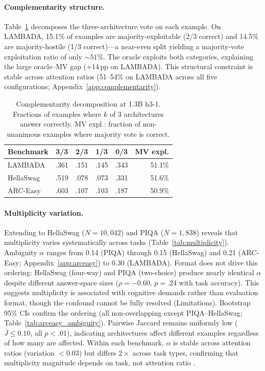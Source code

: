 \paragraph{Complementarity structure.} Table~\ref{tab:complementarity} decomposes the three-architecture vote on each example. On LAMBADA, 15.1\% of examples are majority-exploitable (2/3 correct) and 14.5\% are majority-hostile (1/3 correct)---a near-even split yielding a majority-vote exploitation ratio of only ${\sim}51$\%. The oracle exploits both categories, explaining the large oracle--MV gap ($+14$\,pp on LAMBADA). This structural constraint is stable across attention ratios (51--54\% on LAMBADA across all five configurations; Appendix~\ref{app:complementarity}).

\begin{table}[t]
\centering
\small
\caption{Complementarity decomposition at 1.3B h3-1. Fractions of examples where $k$ of 3 architectures answer correctly. MV expl.: fraction of non-unanimous examples where majority vote is correct.}
\label{tab:complementarity}
\begin{tabular}{@{}lccccr@{}}
\toprule
Benchmark & 3/3 & 2/3 & 1/3 & 0/3 & MV expl. \\
\midrule
LAMBADA & .361 & .151 & .145 & .343 & 51.1\% \\
HellaSwag & .519 & .078 & .073 & .331 & 51.6\% \\
ARC-Easy & .603 & .107 & .103 & .187 & 50.9\% \\
\bottomrule
\end{tabular}
\end{table}

\paragraph{Multiplicity variation.} Extending to HellaSwag ($N = 10{,}042$) and PIQA ($N = 1{,}838$) reveals that multiplicity varies systematically across tasks (Table~\ref{tab:multiplicity}). Ambiguity $\alpha$ \citep{marx2020predictive} ranges from 0.14 (PIQA) through 0.15 (HellaSwag) and 0.21 (ARC-Easy; Appendix~\ref{app:arceasy}) to 0.30 (LAMBADA). Format does not drive this ordering: HellaSwag (four-way) and PIQA (two-choice) produce nearly identical $\alpha$ despite different answer-space sizes ($\rho = -0.60$, $p = .24$ with task accuracy). This suggests multiplicity is associated with cognitive demands rather than evaluation format, though the confound cannot be fully resolved (Limitations). Bootstrap 95\% CIs confirm the ordering (all non-overlapping except PIQA--HellaSwag; Table~\ref{tab:arceasy_ambiguity}). Pairwise Jaccard remains uniformly low ($\bar{J} \leq 0.10$, all $p < .01$), indicating architectures affect different examples regardless of how many are affected. Within each benchmark, $\alpha$ is stable across attention ratios (variation $< 0.03$) but differs $2\times$ across task types, confirming that multiplicity magnitude depends on task, not attention ratio \citep[cf.][]{gorbett2026crossmodel}.

